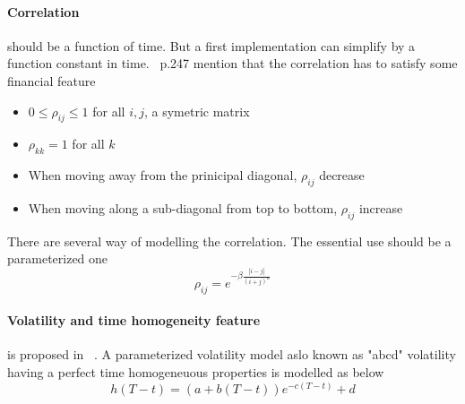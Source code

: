 \documentclass[a4paper,10pt]{article}
\newcommand{\rhoij}{\rho_{ij}}
\begin{document}
\paragraph{Correlation} should be a function of time. But a first implementation can simplify by a function constant in time. ~\cite{BRIGO2006}p.247 mention that the correlation has to satisfy some financial feature
\begin{itemize}
\item $0 \leq \rhoij \leq 1 $ for all $i,j$, a symetric matrix
\item $\rho_{kk} = 1 $ for all $k$ 
\item When moving away from the prinicipal diagonal, $\rhoij$ decrease 
\item When moving along a sub-diagonal from top to bottom, $\rhoij$ increase 
\end{itemize} 
There are several way of modelling the correlation. The essential use should be a parameterized one
\[
\rhoij = e^{- \beta \frac{ |i-j| }{(i+j)^{\alpha}}}
\]
\paragraph{Volatility and time homogeneity feature} is proposed in ~\cite{REBONATO2002}. A parameterized volatility model aslo known as "abcd" volatility having a perfect time homogeneuous properties is modelled as below
\[
h(T-t) = (a + b(T-t)) e^{-c(T-t)} + d
\]
\end{document}

